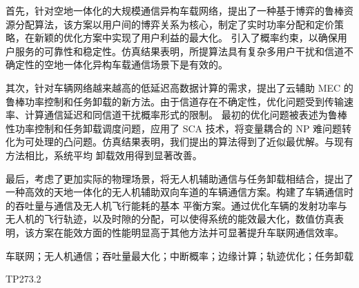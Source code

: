 首先，针对空地一体化的大规模通信异构车载网络，提出了一种基于博弈的鲁棒资源分配算法，该方案以用户间的博弈关系为核心，制定了实时功率分配和定价策略，在新颖的优化方案中实现了用户利益的最大化。
引入了概率约束，以确保用户服务的可靠性和稳定性。仿真结果表明，所提算法具有复杂多用户干扰和信道不确定性的空地一体化异构车载通信场景下是有效的。

其次，针对车辆网络越来越高的低延迟高数据计算的需求，提出了云辅助 MEC 的鲁棒功率控制和任务卸载的新方法。由于信道存在不确定性，优化问题受到传输速率、计算通信延迟和同信道干扰概率形式的限制。
最初的优化问题被表述为鲁棒性功率控制和任务卸载调度问题，应用了 SCA 技术，将变量耦合的 NP 难问题转化为可处理的凸问题。仿真结果表明，我们提出的算法得到了近似最优解。与现有方法相比，系统平均
卸载效用得到显著改善。

最后，考虑了更加实际的物理场景，将无人机辅助通信与任务卸载相结合，提出了一种高效的天地一体化的无人机辅助双向车道的车辆通信方案。构建了车辆通信时的吞吐量与通信及无人机飞行能耗的基本
平衡方案。通过优化车辆的发射功率与无人机的飞行轨迹，以及时隙的分配，可以使得系统的能效最大化，数值仿真表明，该方案在能效方面的性能明显高于其他方法并可显著提升车联网通信效率。

\begin{keywords}
车联网；无人机通信；吞吐量最大化；中断概率；边缘计算；轨迹优化；任务卸载
\end{keywords}

  TP273.2

\newpage\ \vspace{-2.5em}
\vspace{0.23cm}   %
\begin{center}
\makeatletter
{}\textbf{\CAST@value@entitle}    %
\makeatother
\end{center}

